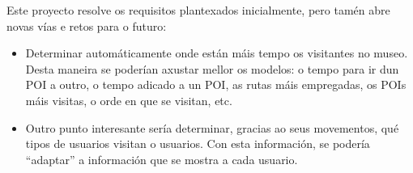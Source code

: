 Este proyecto resolve os requisitos plantexados inicialmente, pero tamén abre novas vías e retos para o futuro:

\begin{itemize}
 \item Determinar automáticamente onde están máis tempo os visitantes no museo. Desta maneira se poderían axustar mellor os modelos: o tempo para ir dun POI a outro, 
 o tempo adicado a un POI, as rutas máis empregadas, os POIs máis visitas, o orde en que se visitan, etc.
 \item Outro punto interesante sería determinar, gracias ao seus movementos, qué tipos de usuarios visitan o usuarios.
   Con esta información, se podería ``adaptar'' a información que se mostra a cada usuario.
\end{itemize}



